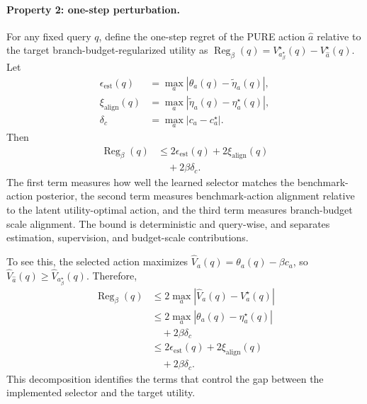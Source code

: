 \documentclass[a4paper,fleqn]{cas-dc}
\begin{document}
\paragraph{Property 2: one-step perturbation.}
For any fixed query $q$, define the one-step regret of the PURE action $\hat{a}$ relative to the target branch-budget-regularized utility as $\operatorname{Reg}_\beta(q)=V_{a_\beta^\star}^\star(q)-V_{\hat{a}}^\star(q)$. Let
\begin{equation}
\label{eq:estimation_alignment_and_cost_error}
\begin{aligned}
\epsilon_{\mathrm{est}}(q)
&=\max_a\left|\theta_a(q)-\tilde{\eta}_a(q)\right|,\\
\xi_{\mathrm{align}}(q)
&=\max_a\left|\tilde{\eta}_a(q)-\eta_a^\star(q)\right|,\\
\delta_c
&=\max_a\left|c_a-c_a^\star\right|.
\end{aligned}
\end{equation}
Then
\begin{equation}
\label{eq:single_step_regret_bound}
\begin{aligned}
\operatorname{Reg}_\beta(q)
&\le
2\epsilon_{\mathrm{est}}(q)
+2\xi_{\mathrm{align}}(q)\\
&\quad +2\beta\delta_c.
\end{aligned}
\end{equation}
The first term measures how well the learned selector matches the benchmark-action posterior, the second term measures benchmark-action alignment relative to the latent utility-optimal action, and the third term measures branch-budget scale alignment. The bound is deterministic and query-wise, and separates estimation, supervision, and budget-scale contributions.

To see this, the selected action maximizes $\widehat{V}_a(q)=\theta_a(q)-\beta c_a$, so $\widehat{V}_{\hat{a}}(q)\ge\widehat{V}_{a_\beta^\star}(q)$. Therefore,
\begin{equation}
\label{eq:regret_decomposition}
\begin{aligned}
\operatorname{Reg}_\beta(q)
&\le
2\max_a\left|
\widehat{V}_a(q)-V_a^\star(q)
\right| \\
&\le
2\max_a\left|
\theta_a(q)-\eta_a^\star(q)
\right| \\
&\quad +2\beta\delta_c \\
&\le
2\epsilon_{\mathrm{est}}(q)
+2\xi_{\mathrm{align}}(q) \\
&\quad +2\beta\delta_c .
\end{aligned}
\end{equation}
This decomposition identifies the terms that control the gap between the implemented selector and the target utility.
\end{document}
